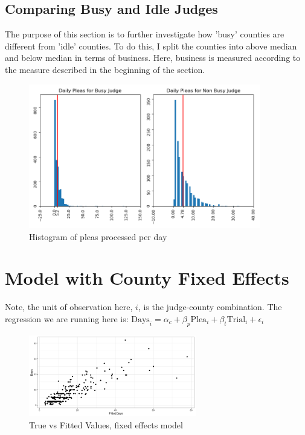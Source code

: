 \documentclass[11pt]{article}
\begin{document}
  \subsection{Comparing Busy and Idle Judges}
    The purpose of this section is to further investigate how 'busy' counties are different from 'idle'
    counties. To do this, I split the counties into above median and below median in terms of business.
    Here, business is measured according to the measure described in the beginning of the section.

    \begin{figure}[H]
      \includegraphics[width=0.9\textwidth]{../../../output/figures/Exploration/busy_vs_idle_judge_plea_hists.png}
      \caption{Histogram of pleas processed per day}
      \label{plea-hist}
    \end{figure}

\section{Model with County Fixed Effects}
  Note, the unit of observation here, $i$, is the judge-county combination. The regression we are running here is:  $\text{Days}_i = \alpha_c + \beta_p \text{Plea}_i + \beta_t \text{Trial}_i + \epsilon_i$

  \begin{figure}[H]
    \centering
    \includegraphics[width=0.65\textwidth]{../../../output/figures/Exploration/fit_fixed_County}
    \caption{True vs Fitted Values, fixed effects model}
  \end{figure}
\end{document}

